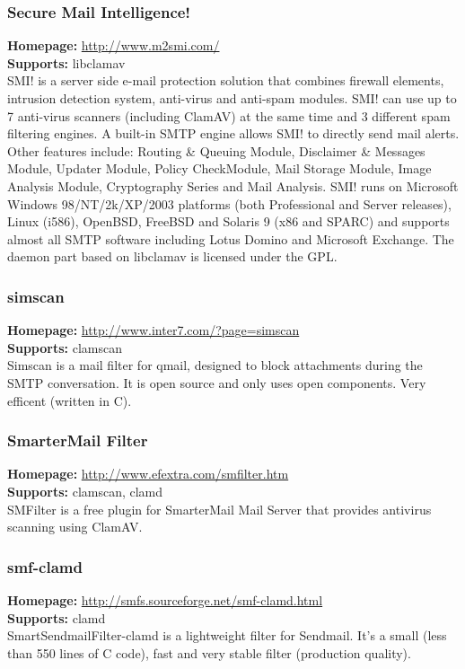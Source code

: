 \documentclass[a4paper,titlepage,12pt]{article}
\begin{document}
    \subsubsection{Secure Mail Intelligence!}
    \textbf{Homepage:} \url{http://www.m2smi.com/}\\
    \textbf{Supports:} libclamav\\[4pt]
    SMI! is a server side e-mail protection solution that combines firewall
    elements, intrusion detection system, anti-virus and anti-spam modules.
    SMI! can use up to 7 anti-virus scanners (including ClamAV) at the same
    time and 3 different spam filtering engines. A built-in SMTP engine allows 
    SMI! to directly send mail alerts. Other features include: Routing \&
    Queuing Module, Disclaimer \& Messages Module, Updater Module, Policy
    CheckModule, Mail Storage Module, Image Analysis Module, Cryptography
    Series and Mail Analysis. SMI! runs on Microsoft Windows 98/NT/2k/XP/2003
    platforms (both Professional and Server releases), Linux (i586), OpenBSD,
    FreeBSD and Solaris 9 (x86 and SPARC) and supports almost all SMTP software
    including Lotus Domino and Microsoft Exchange. The daemon part based on
    libclamav is licensed under the GPL.

    \subsubsection{simscan}
    \textbf{Homepage:} \url{http://www.inter7.com/?page=simscan}\\
    \textbf{Supports:} clamscan\\[4pt]
    Simscan is a mail filter for qmail, designed to block attachments during
    the SMTP conversation. It is open source and only uses open components.
    Very efficent (written in C).

    \subsubsection{SmarterMail Filter}
    \textbf{Homepage:} \url{http://www.efextra.com/smfilter.htm}\\
    \textbf{Supports:} clamscan, clamd\\[4pt]
    SMFilter is a free plugin for SmarterMail Mail Server that provides
    antivirus scanning using ClamAV.

    \subsubsection{smf-clamd}
    \textbf{Homepage:} \url{http://smfs.sourceforge.net/smf-clamd.html}\\
    \textbf{Supports:} clamd\\[4pt]
    SmartSendmailFilter-clamd is a lightweight filter for Sendmail. It's
    a small (less than 550 lines of C code), fast and very stable filter
    (production quality).
\end{document}
